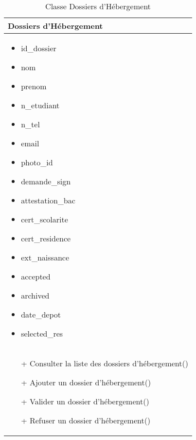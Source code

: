 \begin{table}[H]
    \begin{center}
        \begin{tabular}{|Z{5cm}|}
            \hline
            \textbf{Dossiers d'Hébergement}\\
            \hline
            \begin{itemize}
                \item id\_dossier
                \item nom
                \item prenom
                \item n\_etudiant
                \item n\_tel
                \item email
                \item photo\_id
                \item demande\_sign
                \item attestation\_bac
                \item cert\_scolarite
                \item cert\_residence
                \item ext\_naissance
                \item accepted
                \item archived
                \item date\_depot
                \item selected\_res
            \end{itemize}\\
            \hline
            \begin{itemize}
                \item[+] Consulter la liste des dossiers d'hébergement()
                \item[+] Ajouter un dossier d'hébergement()
                \item[+] Valider un dossier d'hébergement()
                \item[+] Refuser un dossier d'hébergement()
            \end{itemize}
            \\
            \hline
        \end{tabular}	
        \caption{Classe Dossiers d'Hébergement}
    \end{center}
\end{table}

